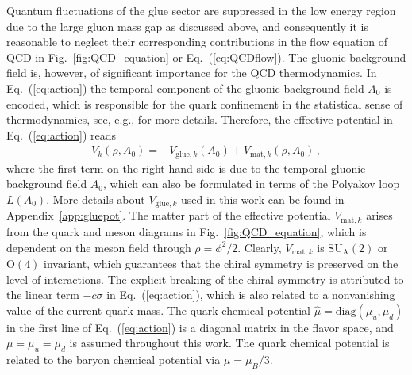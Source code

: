 \documentclass[%
reprint,
superscriptaddress,
showpacs,preprintnumbers,
 amsmath,amssymb,
 aps,
prd,
]{revtex4-1}
\def\Fig#1{Fig.~\ref{#1}} \def\Tab#1{Tab.~\ref{#1}}
\def\Eq#1{Eq.~(\ref{#1})}
\def\app#1{Appendix~\ref{#1}}
\begin{document}
Quantum fluctuations of the glue sector are suppressed in the low energy region due to the large gluon mass gap as discussed above, and consequently it is reasonable to neglect their corresponding contributions in the flow equation of QCD in \Fig{fig:QCD_equation} or \Eq{eq:QCDflow}. The gluonic background field is, however, of significant importance for the QCD thermodynamics. In \Eq{eq:action} the temporal component of the gluonic background field $A_0$ is encoded, which is responsible for the quark confinement in the statistical sense of thermodynamics, see, e.g., \cite{Fukushima:2003fw,Ratti:2005jh,Schaefer:2007pw,Fu:2007xc} for more details. Therefore, the effective potential in \Eq{eq:action} reads
\begin{align}
V_k(\rho,A_0)=&V_{\mathrm{glue},k}(A_0)+V_{\mathrm{mat},k}(\rho,A_0)\,,\label{eq:Vtotal}
\end{align}
where the first term on the right-hand side is due to the temporal gluonic background field $A_0$, which can also be formulated in terms of the Polyakov loop $L(A_0)$. More details about $V_{\mathrm{glue},k}$ used in this work can be found in \app{app:gluepot}. The matter part of the effective potential $V_{\mathrm{mat},k}$ arises from the quark and meson diagrams in \Fig{fig:QCD_equation}, which is dependent on the meson field through $\rho=\phi^2/2$. Clearly,   $V_{\mathrm{mat},k}$ is $\mathrm{SU_A}(2)$ or $\mathrm{O}(4)$ invariant, which guarantees that the chiral symmetry is preserved on the level of interactions. The explicit breaking of the chiral symmetry is attributed to the linear term $-c\sigma$ in \Eq{eq:action}, which is also related to a nonvanishing value of the current quark mass. The quark chemical potential $\hat\mu=\mathrm{diag}(\mu_u,\mu_d)$ in the first line of \Eq{eq:action} is a diagonal matrix in the flavor space, and $\mu=\mu_u=\mu_d$ is assumed throughout this work. The quark chemical potential is related to the baryon chemical potential via $\mu=\mu_B/3$.
\end{document}
